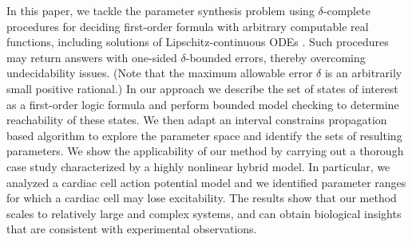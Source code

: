 In this paper, we tackle the parameter synthesis problem using $\delta$-complete procedures \cite{gao12a} 
for deciding first-order formula with arbitrary computable real functions, including solutions 
of Lipschitz-continuous ODEs \citep{gao12b}. Such procedures may return answers with
one-sided $\delta$-bounded errors, thereby overcoming undecidability issues. (Note that the maximum 
allowable error $\delta$ is an arbitrarily small positive rational.) In our approach we describe 
the set of states of interest as a first-order logic formula and perform bounded model checking \cite{BMC}
to determine reachability of these states. We then adapt an interval constrains propagation based algorithm
to explore the parameter space and identify the sets of resulting parameters. 
We show the applicability of our method by carrying out a thorough case study characterized by 
a highly nonlinear hybrid model. In particular, we analyzed a cardiac cell action potential
model \cite{orovio08} and we identified parameter ranges for which a cardiac cell may lose excitability.
The results show that our method scales to relatively large and complex systems, and can obtain 
biological insights that are consistent with experimental observations.


